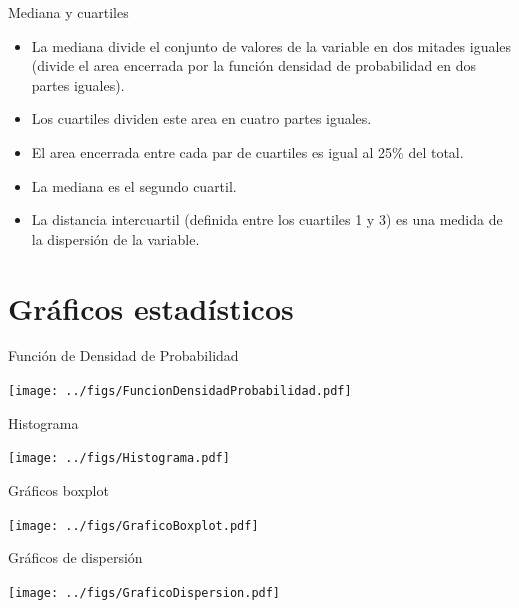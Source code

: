 \documentclass[aspectratio=169, usenames,svgnames,dvipsnames]{beamer}
\begin{document}
\begin{frame}[label={sec:orge2afb6a}]{Mediana y cuartiles}
\begin{itemize}
\item La \alert{mediana} divide el conjunto de valores de la variable en \alert{dos
mitades} iguales (divide el area encerrada por la función densidad
de probabilidad en dos partes iguales).
\item Los \alert{cuartiles} dividen este area en \alert{cuatro} partes iguales.
\item El area encerrada entre cada par de cuartiles es igual al 25\% del total.
\item La \alert{mediana} es el \alert{segundo cuartil}.
\item La \alert{distancia intercuartil} (definida entre los cuartiles 1 y 3) es
una \alert{medida de la dispersión} de la variable.
\end{itemize}
\end{frame}


\section{Gráficos estadísticos}
\label{sec:orgd1e6144}


\begin{frame}[label={sec:orgbe23b9b}]{Función de Densidad de Probabilidad}
\begin{center}
\texttt{[image: ../figs/FuncionDensidadProbabilidad.pdf]}
\end{center}
\end{frame}

\begin{frame}[label={sec:orged9c788}]{Histograma}
\begin{center}
\texttt{[image: ../figs/Histograma.pdf]}
\end{center}
\end{frame}


\begin{frame}[label={sec:org5cc1719}]{Gráficos boxplot}
\begin{center}
\texttt{[image: ../figs/GraficoBoxplot.pdf]}
\end{center}
\end{frame}


\begin{frame}[label={sec:org3becdb1}]{Gráficos de dispersión}
\begin{center}
\texttt{[image: ../figs/GraficoDispersion.pdf]}
\end{center}
\end{frame}
\end{document}
